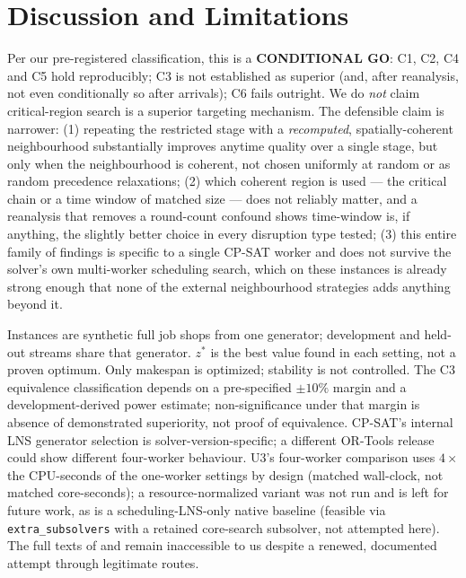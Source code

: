 \documentclass[letterpaper]{article} %
\begin{document}
\section{Discussion and Limitations}
\label{sec:discussion}

Per our pre-registered classification, this is a \textbf{CONDITIONAL GO}: C1, C2, C4 and C5 hold reproducibly; C3 is not established as superior (and, after reanalysis, not even conditionally so after arrivals); C6 fails outright. We do \emph{not} claim critical-region search is a superior targeting mechanism. The defensible claim is narrower: (1) repeating the restricted stage with a \emph{recomputed}, spatially-coherent neighbourhood substantially improves anytime quality over a single stage, but only when the neighbourhood is coherent, not chosen uniformly at random or as random precedence relaxations; (2) which coherent region is used --- the critical chain or a time window of matched size --- does not reliably matter, and a reanalysis that removes a round-count confound shows time-window is, if anything, the slightly better choice in every disruption type tested; (3) this entire family of findings is specific to a single CP-SAT worker and does not survive the solver's own multi-worker scheduling search, which on these instances is already strong enough that none of the external neighbourhood strategies adds anything beyond it.

Instances are synthetic full job shops from one generator; development and held-out streams share that generator. $z^*$ is the best value found in each setting, not a proven optimum. Only makespan is optimized; stability is not controlled. The C3 equivalence classification depends on a pre-specified $\pm10\%$ margin and a development-derived power estimate; non-significance under that margin is absence of demonstrated superiority, not proof of equivalence. CP-SAT's internal LNS generator selection is solver-version-specific; a different OR-Tools release could show different four-worker behaviour. U3's four-worker comparison uses $4\times$ the CPU-seconds of the one-worker settings by design (matched wall-clock, not matched core-seconds); a resource-normalized variant was not run and is left for future work, as is a scheduling-LNS-only native baseline (feasible via \texttt{extra\_subsolvers} with a retained core-search subsolver, not attempted here). The full texts of \citet{sun2026} and \citet{linyang2026} remain inaccessible to us despite a renewed, documented attempt through legitimate routes.
\end{document}
